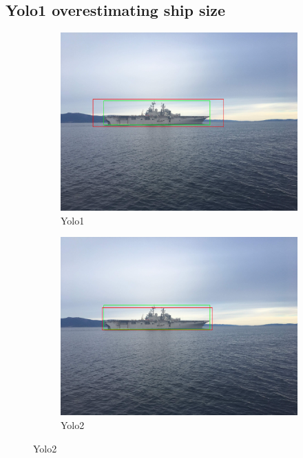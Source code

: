 \subsection{Yolo1 overestimating ship size}
\label{sec:yolo1_big_box}
\begin{figure}[h!]
\begin{subfigure}{.5\textwidth}
  \centering
  \includegraphics[width=0.75\linewidth]{results/case_tr_moor/yolo12/yolo1/big/IMG_2213.jpg}
  \caption{Yolo1}
\end{subfigure}%
\begin{subfigure}{.5\textwidth}
  \centering
  \includegraphics[width=.75\linewidth]{results/case_tr_moor/yolo12/yolo2/big/IMG_2213.jpg}
  \caption{Yolo2}
\end{subfigure}


\end{figure}
